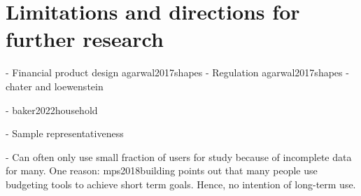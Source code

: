 
\section{Limitations and directions for further research}%
\label{sec:limitations}



- Financial product design agarwal2017shapes
- Regulation agarwal2017shapes
- chater and loewenstein







- baker2022household

- Sample representativeness

- Can often only use small fraction of users for study because of incomplete
data for many. One reason: mps2018building points out that many people use
budgeting tools to achieve short term goals. Hence, no intention of long-term
use.



